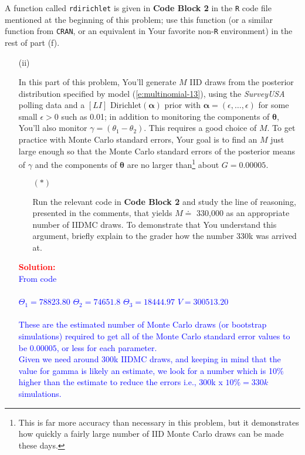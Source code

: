 \documentclass[12pt]{article}
\renewcommand{\b}[1]{\textbf{#1}}
\renewcommand{\t}[1]{\texttt{#1}}
\begin{document}
\begin{itemize}
\begin{itemize}
\begin{itemize}
\end{itemize}

A function called \texttt{rdirichlet} is given in \b{Code Block 2} in the \t{R} code file mentioned at the beginning of this problem; use this function (or a similar function from \t{CRAN}, or an equivalent in Your favorite non-\texttt{R} environment) in the rest of part (f).

\begin{itemize}

\item[(ii)]

In this part of this problem, You'll generate $M$ IID draws from the posterior distribution specified by model (\ref{e:multinomial-13}), using the \textit{SurveyUSA} polling data and a $[ LI ]$ Dirichlet$( \bm{ \alpha } )$ prior with $\bm{ \alpha } = ( \epsilon, \dots, \epsilon )$ for some small $\epsilon > 0$ such as 0.01; in addition to monitoring the components of $\bm{ \theta }$, You'll also monitor $\gamma = ( \theta_1 - \theta_2 )$. This requires a good choice of $M$. To get practice with Monte Carlo standard errors, Your goal is to find an $M$ just large enough so that the Monte Carlo standard errors of the posterior means of $\gamma$ and the components of $\bm{ \theta }$ are no larger than\footnote{This is far more accuracy than necessary in this problem, but it demonstrates how quickly a fairly large number of IID Monte Carlo draws can be made these days.} about $G = 0.00005$.

\begin{itemize}

\item[$( * )$]

Run the relevant code in \b{Code Block 2} and study the line of reasoning, presented in the comments, that yields $M \doteq$ 330,000 as an appropriate number of IIDMC draws. To demonstrate that You understand this argument, briefly explain to the grader how the number 330k was arrived at. \textit{\fbox{\textbf{[10 points]}}}

\end{itemize}
\textcolor{red}{\textbf{Solution:}} \\
\textcolor{blue}{From code
\\ \\
\(\Theta_1 = 78823.80\)
\(\Theta_2 = 74651.8\)
\(\Theta_3 = 18444.97\)
\(V = 300513.20\)
\\ \\
These are the estimated number of Monte Carlo draws (or bootstrap simulations) required to get all of the Monte Carlo standard error values to be \(0.00005\), or less for each parameter.
\\
Given we need around 300k IIDMC draws, and keeping in mind that the value for gamma is likely an estimate, we look for a number which is 10\% higher than the estimate to reduce the errors i.e., 300k x \(10\% = 330k\) simulations.
}


\end{itemize}
\end{itemize}
\end{itemize}
\end{document}
